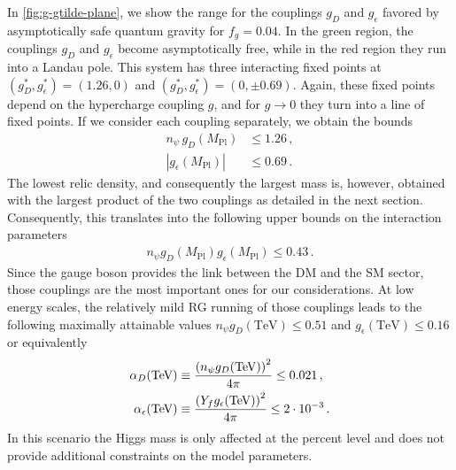 \documentclass[aps,prd,twocolumn,preprintnumbers,superscriptaddress,nobibnotes,floatfix,longbibliography]{revtex4-1}
\begin{document}
In \autoref{fig:g-gtilde-plane}, we show the range for the couplings $g_D$ and $g_\epsilon $ favored by asymptotically safe quantum gravity for $f_g=0.04$.
In the green region, the couplings $g_D$ and $g_\epsilon$ become asymptotically free,
while in the red region they run into a Landau pole.
This system has three interacting fixed points at $(g_D^*,g_\epsilon^*) = (1.26,0)$ and $(g_D^*,g_\epsilon^*) = (0,\pm  0.69)$.
Again, these fixed points depend on the hypercharge coupling $g$, and for $g\to0$ they turn into a line of fixed points. 
If we consider each coupling separately, we obtain the bounds
\begin{align}
n_\psi\,g_D (M_\text{Pl}) &\leq 1.26 \,, \nonumber \\
\left| g_\epsilon  (M_\text{Pl}) \right| &\leq 0.69 \,.
\end{align}
The lowest relic density, and consequently the largest mass is, however, obtained with the largest product of the two couplings as detailed in the next section.
Consequently, this translates into the following upper bounds on the interaction parameters
\begin{align}
\label{eq:prediction-g-b}
n_\psi g_D (M_\text{Pl}) g_\epsilon  (M_\text{Pl}) \leq 0.43 \,.
\end{align}
Since the gauge boson provides the link between the DM and the SM sector, those couplings are the most important ones for our considerations. At low energy scales, the relatively mild RG running of those couplings leads to the following maximally attainable values $n_\psi g_D (\text{TeV}) \leq 0.51$ and $ g_\epsilon  (\text{TeV}) \leq 0.16$ or equivalently 
\begin{align}
\label{eq:prediction-alpha}
\alpha_D(\text{TeV})&\equiv \frac{\left(n_\psi g_D(\text{TeV})\right)^2}{4 \pi} \leq 0.021\,,\notag \\
\alpha_\epsilon(\text{TeV})&\equiv \frac{\left(Y_f  g_\epsilon(\text{TeV})\right)^2}{4 \pi} \leq 2\cdot 10^{-3}\,.
\end{align}
In this scenario the Higgs mass is only affected at the percent level and does not provide additional constraints on the model parameters.
\end{document}

